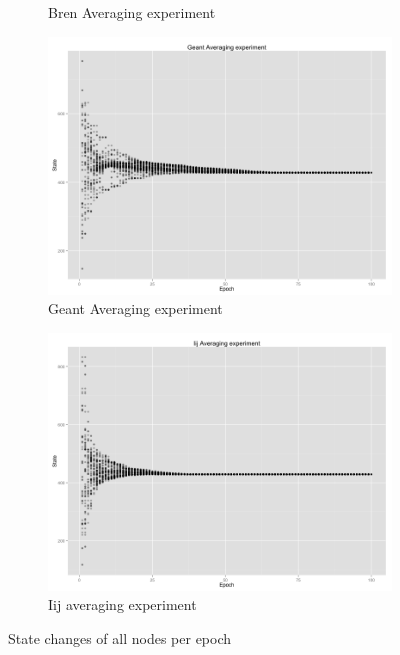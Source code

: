 \begin{figure}[h!]
\begin{subfigure}[t]{0.47\textwidth}
    \caption{Bren Averaging experiment}
    \end{subfigure}
    \vspace{5ex}
    \begin{subfigure}[t]{0.47\textwidth}
    \vspace{0pt}
    \includegraphics[width=\linewidth]{figures/Geant.png}
    \caption{Geant Averaging experiment}
    \end{subfigure}
    \begin{subfigure}[t]{0.47\textwidth}
    \vspace{0pt}
    \includegraphics[width=\linewidth]{figures/Iij.png}
    \caption{Iij averaging experiment}
    \end{subfigure}
    \caption{State changes of all nodes per epoch}
    \label{fig:result}
\end{figure}
